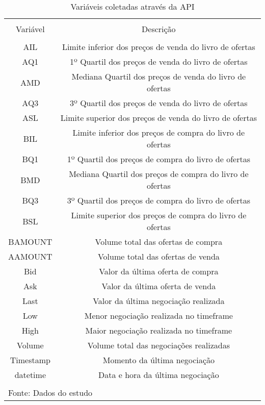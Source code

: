 
\begin{table}[h] \centering 
  \caption{Variáveis coletadas através da API} 
  \label{vars} 
\small 
\begin{tabular}{@{\extracolsep{5pt}} cc} 
\\[-1.8ex]\hline 
\hline \\[-1.8ex] 
Variável & Descrição \\ 
\hline \\[-1.8ex] 
AIL & Limite inferior dos preços de venda do livro de ofertas \\ 
AQ1 & 1º Quartil dos preços de venda do livro de ofertas \\ 
AMD & Mediana Quartil dos preços de venda do livro de ofertas \\ 
AQ3 & 3º Quartil dos preços de venda do livro de ofertas \\ 
ASL & Limite superior dos preços de venda do livro de ofertas \\ 
BIL & Limite inferior dos preços de compra do livro de ofertas \\ 
BQ1 & 1º Quartil dos preços de compra do livro de ofertas \\ 
BMD & Mediana Quartil dos preços de compra do livro de ofertas \\ 
BQ3 & 3º Quartil dos preços de compra do livro de ofertas \\ 
BSL & Limite superior dos preços de compra do livro de ofertas \\ 
BAMOUNT & Volume total das ofertas de compra \\ 
AAMOUNT & Volume total das ofertas de venda \\ 
Bid & Valor da última oferta de compra \\ 
Ask & Valor da última oferta de venda \\ 
Last & Valor da última negociação realizada \\ 
Low & Menor negociação realizada no timeframe \\ 
High & Maior negociação realizada no timeframe \\ 
Volume & Volume total das negociações realizadas \\ 
Timestamp & Momento da última negociação \\ 
datetime & Data e hora da última negociação \\ 
\hline \\[-1.8ex] 
\multicolumn{2}{l}{Fonte: Dados do estudo} \\ 
\end{tabular} 
\end{table} 
